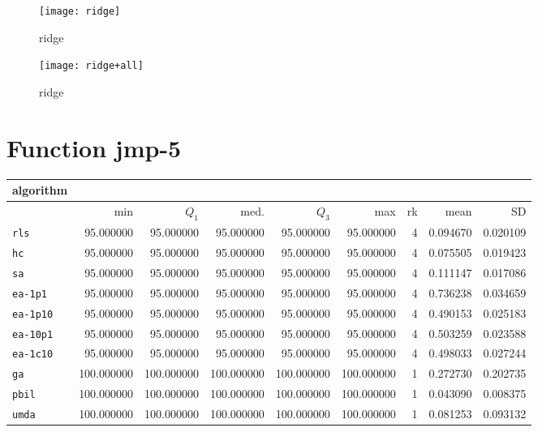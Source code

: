 \begin{center}
\begin{figure}[h]
\centering
\texttt{[image: ridge]}
\caption{ridge}
\end{figure}
\end{center}

\begin{center}
\begin{figure}[h]
\centering
\texttt{[image: ridge+all]}
\caption{ridge}
\end{figure}
\end{center}

\newpage

\section{Function jmp-5}
\begin{center}
\begin{tabular}{@{}l*{5}{>{{}}N{3}{0}}>{{}}N{2}{0}N{1}{3}N{1}{3}@{}}
\toprule
{algorithm} &  &  \\
\midrule
& {min} & {$Q_1$} & {med.} & {$Q_3$} & {max} & {rk} & {mean} & {SD} \\
\midrule
\verb|rls| & 95.000000 & 95.000000 & 95.000000 & 95.000000 & 95.000000 & 4 & 0.094670 & 0.020109 \\
 \verb|hc| & 95.000000 & 95.000000 & 95.000000 & 95.000000 & 95.000000 & 4 & 0.075505 & 0.019423 \\
 \verb|sa| & 95.000000 & 95.000000 & 95.000000 & 95.000000 & 95.000000 & 4 & 0.111147 & 0.017086 \\
 \verb|ea-1p1| & 95.000000 & 95.000000 & 95.000000 & 95.000000 & 95.000000 & 4 & 0.736238 & 0.034659 \\
 \verb|ea-1p10| & 95.000000 & 95.000000 & 95.000000 & 95.000000 & 95.000000 & 4 & 0.490153 & 0.025183 \\
 \verb|ea-10p1| & 95.000000 & 95.000000 & 95.000000 & 95.000000 & 95.000000 & 4 & 0.503259 & 0.023588 \\
 \verb|ea-1c10| & 95.000000 & 95.000000 & 95.000000 & 95.000000 & 95.000000 & 4 & 0.498033 & 0.027244 \\
 \verb|ga| & {\color{blue}} 100.000000 & {\color{blue}} 100.000000 & {\color{blue}} 100.000000 & {\color{blue}} 100.000000 & {\color{blue}} 100.000000 & 1 & 0.272730 & 0.202735 \\
 \verb|pbil| & {\color{blue}} 100.000000 & {\color{blue}} 100.000000 & {\color{blue}} 100.000000 & {\color{blue}} 100.000000 & {\color{blue}} 100.000000 & 1 & 0.043090 & 0.008375 \\
 \verb|umda| & {\color{blue}} 100.000000 & {\color{blue}} 100.000000 & {\color{blue}} 100.000000 & {\color{blue}} 100.000000 & {\color{blue}} 100.000000 & 1 & 0.081253 & 0.093132 \\
 \bottomrule
\end{tabular}
\end{center}

